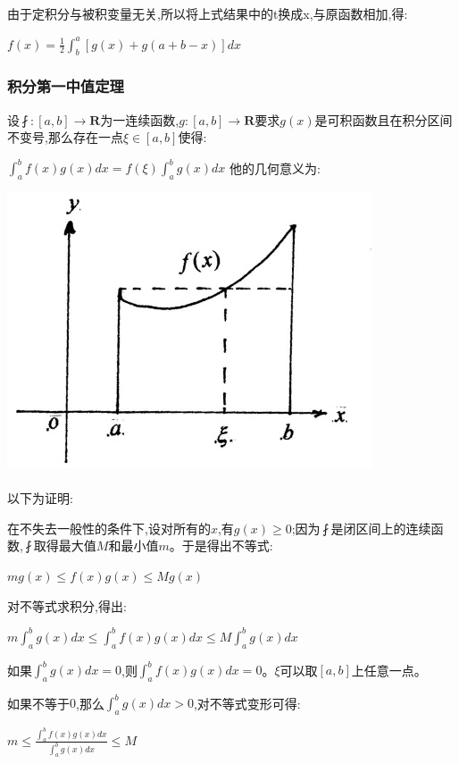 \documentclass[UTF8]{ctexbook}
\newcommand{\defFunction}[1]{f(#1)}
\newcommand{\definiteIntegral}[2]{\int^{#1}_{#2}}
\begin{document}
{{{{  由于定积分与被积变量无关,所以将上式结果中的t换成x,与原函数相加,得:

  $\defFunction{x} = \frac{1}{2}\definiteIntegral{a}{b}[g(x) + g(a + b - x)]dx$
}%

\subsubsection{积分第一中值定理}{
设$\fint:[a,b] \to \mathbf{R}$为一连续函数,$g:[a,b] \to \mathbf{R}$要求$g(x)$是可积函数且在积分区间不变号,那么存在一点$\xi\in[a,b]$使得:

$\definiteIntegral{b}{a}\defFunction{x}g(x)dx = \defFunction{\xi}\definiteIntegral{b}{a}g(x)dx$
他的几何意义为:

\includegraphics{resources/Geometric_explanation_of_the_mean_value_theorem_for_integration.jpg}
\\\\
以下为证明:

在不失去一般性的条件下,设对所有的$x$,有$g(x) \geq 0$;因为$\fint$是闭区间上的连续函数,$\fint$取得最大值$M$和最小值$m$。于是得出不等式:

$mg(x) \leq \defFunction{x}g(x) \leq Mg(x)$

对不等式求积分,得出:

$m\definiteIntegral{b}{a}g(x)dx \leq \definiteIntegral{b}{a}\defFunction{x}g(x)dx \leq M\definiteIntegral{b}{a}g(x)dx$

如果$\definiteIntegral{b}{a}g(x)dx = 0$,则$\definiteIntegral{b}{a}\defFunction{x}g(x)dx = 0$。$\xi$可以取$[a,b]$上任意一点。

如果不等于$0$,那么$\definiteIntegral{b}{a}g(x)dx>0$,对不等式变形可得:

$m \leq \frac{\definiteIntegral{b}{a}\defFunction{x}g(x)dx}{\definiteIntegral{b}{a}g(x)dx} \leq M$

}}}}
\end{document}
